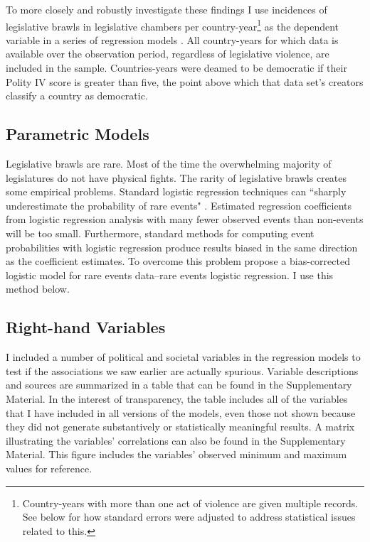 \documentclass[a4paper]{article}\usepackage[]{graphicx}\usepackage[]{color}
\begin{document}
To more closely and robustly investigate these findings I use incidences of legislative brawls in  legislative chambers per country-year\footnote{Country-years with more than one act of violence are given multiple records. See below for how standard errors were adjusted to address statistical issues related to this.} as the dependent variable in a series of regression models \citep{KingRareEvents2001, KingRareEventsPA2001}. All country-years for which data is available over the observation period, regardless of legislative violence, are included in the sample. Countries-years were deamed to be democratic if their Polity IV score \citep{Marshall2009} is greater than five, the point above which that data set's creators classify a country as democratic.

\subsection*{Parametric Models}

Legislative brawls are rare. Most of the time the overwhelming majority of legislatures do not have physical fights. The rarity of legislative brawls creates some empirical problems. Standard logistic regression techniques can ``sharply underestimate the probability of rare events" \cite[137]{KingRareEventsPA2001}. Estimated regression coefficients from logistic regression analysis with many fewer observed events than non-events will be too small. Furthermore, standard methods for computing event probabilities with logistic regression produce results biased in the same direction as the coefficient estimates. To overcome this problem \cite{KingRareEvents2001,KingRareEventsPA2001} propose a bias-corrected logistic model for rare events data--rare events logistic regression. I use this method below.

\subsection*{Right-hand Variables}

I included a number of political and societal variables in the regression models to test if the associations we saw earlier are actually spurious. Variable descriptions and sources are summarized in a table that can be found in the Supplementary Material. In the interest of transparency, the table includes all of the variables that I have included in all versions of the models, even those not shown because they did not generate substantively or statistically meaningful results. A matrix illustrating the variables' correlations can also be found in the Supplementary Material. This figure includes the variables' observed minimum and maximum values for reference.
\end{document}
